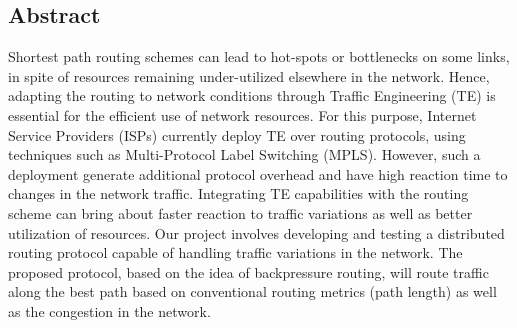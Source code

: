 \label{sec:abstract}
\begin{center}
\section*{Abstract}
\end{center}

Shortest path routing schemes can lead to hot-spots or bottlenecks on some links, in spite of resources remaining under-utilized elsewhere in the network. Hence, adapting the routing to network conditions through Traffic Engineering (TE) is essential for the efficient use of network resources. For this purpose, Internet Service Providers (ISPs) currently deploy TE over routing protocols, using techniques such as Multi-Protocol Label Switching (MPLS). However, such a deployment generate additional protocol overhead and have high reaction time to changes in the network traffic. Integrating TE capabilities with the routing scheme can bring about faster reaction to traffic variations as well as better utilization of resources. Our project involves developing and testing a distributed routing protocol capable of handling traffic variations in the network. The proposed protocol, based on the idea of backpressure routing, will route traffic along the best path based on conventional routing metrics (path length) as well as the congestion in the network.
